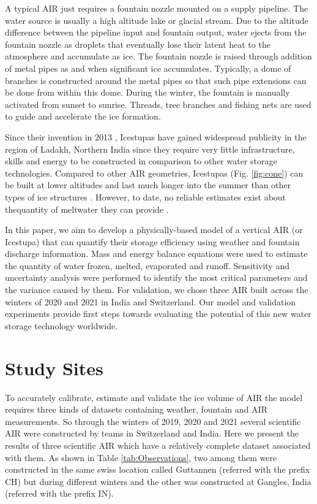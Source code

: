 \documentclass[utf8]{frontiersSCNS} %
\begin{document}
A typical AIR just requires a fountain nozzle mounted on a supply pipeline. The water source is usually a high altitude
lake or glacial stream. Due to the altitude difference between the pipeline input and fountain output, water ejects from
the fountain nozzle as droplets that eventually lose their latent heat to the atmosphere and accumulate as ice. The
fountain nozzle is raised through addition of metal pipes as and when significant ice accumulates.  Typically, a dome of
branches is constructed around the metal pipes so that such pipe extensions can be done from within this dome. During
the winter, the fountain is manually activated from sunset to sunrise. Threads, tree branches and fishing nets are used
to guide and accelerate the ice formation.

Since their invention in 2013 \citep{campaign}, Icestupas have gained widespread publicity in the region of Ladakh,
Northern India since they require very little infrastructure, skills and energy to be constructed in comparison to other
water storage technologies. Compared to other AIR geometries, Icestupas (Fig. \ref{fig:cone}) can be built at lower
altitudes and last much longer into the summer than other types of ice structures \citep{campaign}. However, to date, no
reliable estimates exist about thequantity of meltwater they can provide \citep{Nusser_2018}.

In this paper, we aim to develop a physically-based model of a vertical AIR (or Icestupa) that can quantify their
storage efficiency using weather and fountain discharge information. Mass and energy balance equations were used to
estimate the quantity of water frozen, melted, evaporated and runoff. Sensitivity and uncertainty analysis were
performed to identify the most critical parameters and the variance caused by them. For validation, we chose three AIR
built across the winters of 2020 and 2021 in India and Switzerland. Our model and validation experiments provide first
steps towards evaluating the potential of this new water storage technology worldwide.

\section{Study Sites}
To accurately calibrate, estimate and validate the ice volume of AIR the model requires three kinds of datasets
containing weather, fountain and AIR measurements. So through the winters of 2019, 2020 and 2021 several scientific AIR
were constructed by teams in Switzerland and India. Here we present the results of three scientific AIR which have a
relatively complete dataset associated with them. As shown in Table \ref{tab:Observations}, two among them were
constructed in the same swiss location called Guttannen (referred with the prefix CH) but during different winters and
the other was constructed at Gangles, India (referred with the prefix IN).
\end{document}
